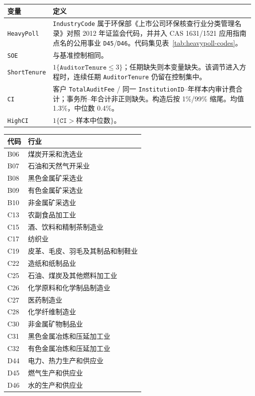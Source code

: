 \documentclass[11pt]{article}
\begin{document}
\begin{center}
\begin{threeparttable}
\caption{文献导向调节变量}
\begin{tabular}{lp{10.4cm}}
\toprule
变量 & 定义 \\
\midrule
\texttt{HeavyPoll} & \texttt{IndustryCode} 属于环保部《上市公司环保核查行业分类管理名录》对照 2012 年证监会代码，并并入 CAS 1631/1521 应用指南点名的公用事业 \texttt{D45}/\texttt{D46}。代码集见表~\ref{tab:heavypoll-codes}。 \\
\texttt{SOE} & 与基准控制相同。 \\
\texttt{ShortTenure} & \(1\{\texttt{AuditorTenure}\le 3\}\)；任期缺失则本变量缺失。该调节进入方程时，连续任期 \texttt{AuditorTenure} 仍留在控制集中。 \\
\texttt{CI} & 客户 \texttt{TotalAuditFee} / 同一 \texttt{InstitutionID}--年样本内审计费合计；事务所--年合计非正则缺失。构造后按 1\%/99\% 缩尾。均值 1.3\%，中位数 0.4\%。 \\
\texttt{HighCI} & \(1\{\texttt{CI}>\text{样本中位数}\}\)。 \\
\bottomrule
\end{tabular}
\end{threeparttable}
\end{center}

\begin{center}
\begin{threeparttable}
\caption{重污染行业代码}
\label{tab:heavypoll-codes}
\begin{tabular}{ll}
\toprule
代码 & 行业 \\
\midrule
B06 & 煤炭开采和洗选业 \\
B07 & 石油和天然气开采业 \\
B08 & 黑色金属矿采选业 \\
B09 & 有色金属矿采选业 \\
B10 & 非金属矿采选业 \\
C13 & 农副食品加工业 \\
C15 & 酒、饮料和精制茶制造业 \\
C17 & 纺织业 \\
C19 & 皮革、毛皮、羽毛及其制品和制鞋业 \\
C22 & 造纸和纸制品业 \\
C25 & 石油、煤炭及其他燃料加工业 \\
C26 & 化学原料和化学制品制造业 \\
C27 & 医药制造业 \\
C28 & 化学纤维制造业 \\
C30 & 非金属矿物制品业 \\
C31 & 黑色金属冶炼和压延加工业 \\
C32 & 有色金属冶炼和压延加工业 \\
D44 & 电力、热力生产和供应业 \\
D45 & 燃气生产和供应业 \\
D46 & 水的生产和供应业 \\
\bottomrule
\end{tabular}
\end{threeparttable}
\end{center}
\end{document}
